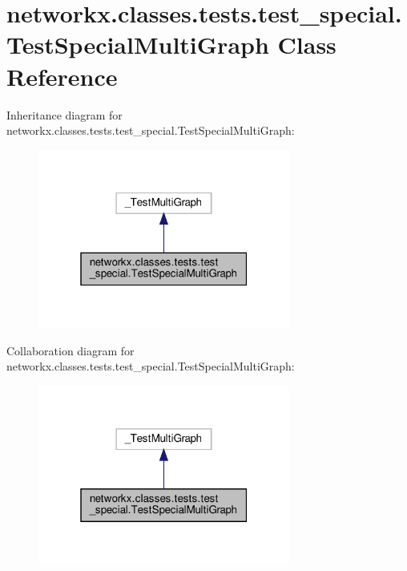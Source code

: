 \hypertarget{classnetworkx_1_1classes_1_1tests_1_1test__special_1_1TestSpecialMultiGraph}{}\section{networkx.\+classes.\+tests.\+test\+\_\+special.\+Test\+Special\+Multi\+Graph Class Reference}
\label{classnetworkx_1_1classes_1_1tests_1_1test__special_1_1TestSpecialMultiGraph}


Inheritance diagram for networkx.\+classes.\+tests.\+test\+\_\+special.\+Test\+Special\+Multi\+Graph\+:
\nopagebreak
\begin{figure}[H]
\begin{center}
\leavevmode
\includegraphics[width=235pt]{classnetworkx_1_1classes_1_1tests_1_1test__special_1_1TestSpecialMultiGraph__inherit__graph}
\end{center}
\end{figure}


Collaboration diagram for networkx.\+classes.\+tests.\+test\+\_\+special.\+Test\+Special\+Multi\+Graph\+:
\nopagebreak
\begin{figure}[H]
\begin{center}
\leavevmode
\includegraphics[width=235pt]{classnetworkx_1_1classes_1_1tests_1_1test__special_1_1TestSpecialMultiGraph__coll__graph}
\end{center}
\end{figure}
